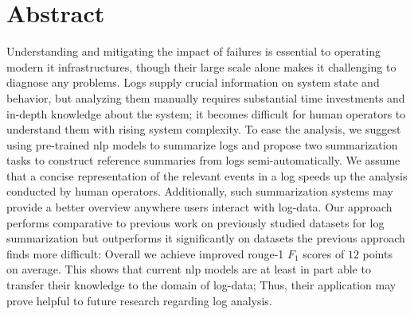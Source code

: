 \vspace{-1.5cm}

{\let\cleardoublepage\relax \chapter*{Abstract}}
\thispagestyle{empty}

\vspace{-0.5cm}

Understanding and mitigating the impact of failures is essential to operating modern \ac{it} infrastructures,
though their large scale alone makes it challenging to diagnose any problems.
Logs supply crucial information on system state and behavior,
but analyzing them manually requires substantial time investments and in-depth knowledge about the system;
it becomes difficult for human operators to understand them with rising system complexity.
To ease the analysis, we suggest using pre-trained \ac*{nlp} models to summarize logs
and propose two summarization tasks to construct reference summaries from logs semi-automatically.
We assume that a concise representation of the relevant events in a log speeds up the analysis conducted by human operators.
Additionally, such summarization systems may provide a better overview anywhere users interact with log-data.
Our approach performs comparative to previous work on previously studied datasets for log summarization
but outperforms it significantly on datasets the previous approach finds more difficult:
Overall we achieve improved \acs*{rouge}-1 \(F_1\) scores of \(12\) points on average.
This shows that current \acs*{nlp} models are at least in part able to transfer their knowledge to the domain of log-data;
Thus, their application may prove helpful to future research regarding log analysis.

\cleardoublepage

\tableofcontents

\newpage

\listoffigures
\listoftables
\printacronyms[heading=chapter*, name=List of Acronyms]

\setlength{\parindent}{\origparident}
